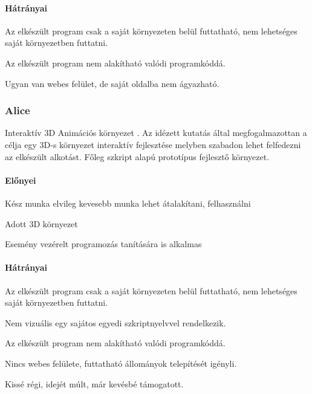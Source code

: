 \documentclass[12pt,a4paper,oneside]{report} %
\begin{document}
\paragraph{Hátrányai} 
\begin{compactitem}
	\item Az elkészült program csak a saját környezeten belül futtatható, nem lehetséges saját környezetben futtatni.
	\item Az elkészült program nem alakítható valódi programkóddá.
	\item Ugyan van webes felület, de saját oldalba nem ágyazható.
\end{compactitem}

\subsubsection{Alice} Interaktív 3D Animációs környezet \cite{cooper2000alice}. Az idézett kutatás által megfogalmazottan a  célja egy 3D-s környezet interaktív fejlesztése melyben szabadon lehet felfedezni az elkészült alkotást. Főleg szkript alapú prototípus fejlesztő környezet. 
\paragraph{Előnyei} 
\begin{compactitem}
	\item Kész munka elvileg kevesebb munka lehet átalakítani, felhasználni
	\item Adott 3D környezet
	\item Esemény vezérelt programozás tanítására is alkalmas
\end{compactitem}
\paragraph{Hátrányai} 
\begin{compactitem}
	\item Az elkészült program csak a saját környezeten belül futtatható, nem lehetséges saját környezetben futtatni.
	\item Nem vizuális egy sajátos egyedi szkriptnyelvvel rendelkezik.
	\item Az elkészült program nem alakítható valódi programkóddá.
	\item Nincs webes felülete, futtatható állományok telepítését igényli.
	\item Kissé régi, idejét múlt, már kevésbé támogatott.
\end{compactitem}
\end{document}
